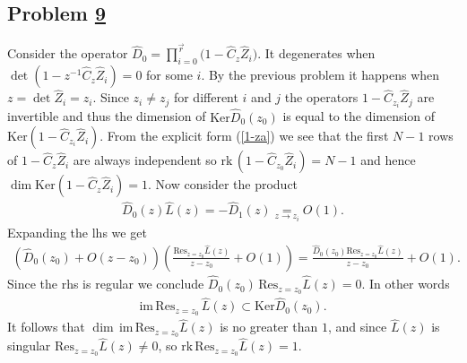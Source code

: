 \documentclass[12pt]{article}
\numberwithin{equation}{section}
\theoremstyle{definition}
\newcommand{\Ker}{{\mathrm{Ker}}}
\newcommand{\myhref}[2]{\hyperref[#1]{#2}}%
\begin{document}
\subsection{Problem \myhref{prob9}{9}}
Consider the operator $ \hat{D}_{0} = \prod\limits_{i = 0}^{\overset{\longrightarrow}{r}}\big( 1 - \hat{C}_{z} \hat{Z}_{i}\big)$. It degenerates when $\det (1 - z^{-1}\hat{C}_{z} \hat{Z}_{i})=0$ for some $i$. By the previous problem it happens when $z = \det \hat{Z}_{i} = z_{i}$. Since $z_{i} \neq z_{j}$ for different $i$ and $j$ the operators $1 - \hat{C}_{z_i}\hat{Z}_{j}$ are invertible and thus the dimension of $\Ker \hat{D}_{0}(z_{0})$ is equal to the dimension of $\Ker (1 - \hat{C}_{z_i} \hat{Z}_{i})$. From the explicit form (\ref{1-za}) we see that the first $N-1$ rows of  $1 - \hat{C}_{z} \hat{Z}_{i}$ are always independent so $\mathrm{rk}\, (1 - \hat{C}_{z_0} \hat{Z}_{i}) = N-1$ and hence $\dim\Ker(1 - \hat{C}_{z} \hat{Z}_{i}) = 1$. Now consider the product
\begin{align*}
    \hat{D}_{0}(z)\hat{L}(z) = -\hat{D}_{1}(z) \underset{z \rightarrow z_{i}}{=} O(1).
\end{align*}
Expanding the lhs we get
\begin{align*}
    \left(\hat{D}_{0}(z_0 ) + O(z-z_{0})\right)\left(\frac{\mathrm{Res}_{z = z_0} \hat{L}(z)}{z - z_{0}} + O(1)\right) = \frac{\hat{D}_{0}(z_0 ) \mathrm{Res}_{z = z_0}\hat{L}(z)}{z - z_{0}} + O(1).
\end{align*}
Since the rhs is regular we conclude $\hat{D}_{0}(z_0 ) \, \mathrm{Res}_{z = z_0}\hat{L}(z) = 0$. In other words 
\begin{align*}
    \mathrm{im}\, \mathrm{Res}_{z = z_0}\, \hat{L}(z) \subset \Ker \hat{D}_{0}(z_0 ).
\end{align*}
It follows that $\dim\, \mathrm{im}\, \mathrm{Res}_{z = z_0}\hat{L}(z)$ is no greater than $1$, and since $\hat{L}(z)$ is singular $\mathrm{Res}_{z = z_0}\hat{L}(z) \neq 0$, so $\mathrm{rk}\,  \mathrm{Res}_{z = z_0}\hat{L}(z) = 1$.
\end{document}
